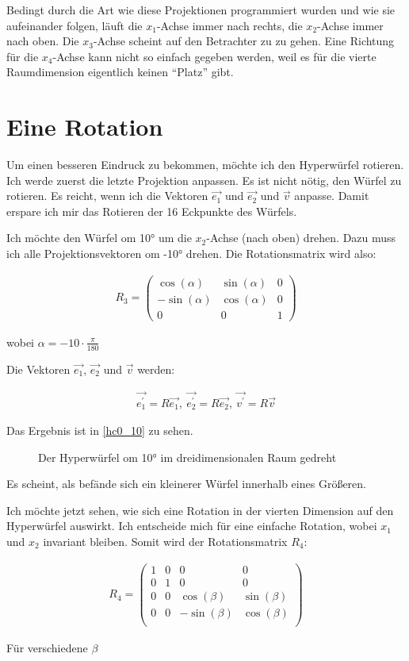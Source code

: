 \documentclass[10pt,a4paper,twoside,titlepage]{article}
\newcommand{\myeq}[2]{
	\begin{equation}
		\begin{split}
			#1
		\end{split}
		\label{#2}
	\end{equation}
}
\newcommand{\psimg}[3]{
    \begin{figure}[!ht]
        \centering
        
        \caption{#2}
        #3
    \end{figure}
}
\begin{document}
Bedingt durch die Art wie diese Projektionen programmiert wurden und wie sie
aufeinander folgen, läuft die $x_1$-Achse immer nach rechts, die $x_2$-Achse
immer nach oben. Die $x_3$-Achse scheint auf den Betrachter zu zu gehen. Eine 
Richtung für die $x_4$-Achse kann nicht so einfach gegeben werden, weil es für
die vierte Raumdimension eigentlich keinen "`Platz"' gibt.

\section{Eine Rotation}
Um einen besseren Eindruck zu bekommen, möchte ich den Hyperwürfel rotieren.
Ich werde zuerst die letzte Projektion anpassen. Es ist nicht nötig, den
Würfel zu rotieren. Es reicht, wenn ich die Vektoren $\vec{e_1}$ und
$\vec{e_2}$ und $\vec{v}$ anpasse. Damit erspare ich mir das Rotieren der
16 Eckpunkte des Würfels.

Ich möchte den Würfel om 10° um die $x_2$-Achse (nach oben) drehen. 
Dazu muss ich alle Projektionsvektoren om -10° drehen. Die Rotationsmatrix 
wird also:
\myeq{ R_3 = 
    \begin{pmatrix}
        \cos(\alpha) & \sin(\alpha) & 0\\
        -\sin(\alpha) &\cos(\alpha) & 0\\
        0 & 0 & 1
    \end{pmatrix}
}{rot1}
wobei $\alpha = -10 \cdot \frac{\pi}{180}$

Die Vektoren $\vec{e_1}$, $\vec{e_2}$ und $\vec{v}$ werden:
\myeq{\vec{e^\prime_1} = R \vec{e_1},\  
    \vec{e^\prime_2} = R \vec{e_2},\ 
    \vec{v^\prime} = R \vec{v}}{rot2}

Das Ergebnis ist in \autoref{hc0_10} zu sehen.

\psimg{python/hc0_10.tex}{Der Hyperwürfel om 10° im dreidimensionalen 
    Raum gedreht}{\label{hc0_10}}

Es scheint, als befände sich ein kleinerer Würfel innerhalb 
eines Größeren.

Ich möchte jetzt sehen, wie sich eine Rotation in der vierten Dimension
auf den Hyperwürfel auswirkt. Ich entscheide mich für eine einfache
Rotation, wobei $x_1$ und $x_2$ invariant bleiben. Somit wird der 
Rotationsmatrix $R_4$:
\myeq{R_4 = 
    \begin{pmatrix}
         1&0&0&0\\
         0&1&0&0\\
        0&0&\cos(\beta)&\sin(\beta)\\
        0&0&-\sin(\beta)&\cos(\beta)\\
    \end{pmatrix}    
}{rot3}
Für verschiedene $\beta$
\end{document}
